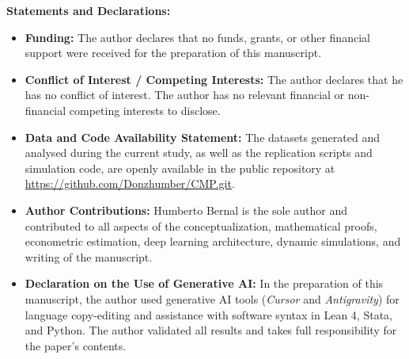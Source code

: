\documentclass[12pt]{article}
\begin{document}
\noindent \textbf{Statements and Declarations:}
\begin{itemize}\small
    \item \textbf{Funding:} The author declares that no funds, grants, or other financial support were received for the preparation of this manuscript.
    \item \textbf{Conflict of Interest / Competing Interests:} The author declares that he has no conflict of interest. The author has no relevant financial or non-financial competing interests to disclose.
    \item \textbf{Data and Code Availability Statement:} The datasets generated and analysed during the current study, as well as the replication scripts and simulation code, are openly available in the public repository at \url{https://github.com/Donzhumber/CMP.git}.
    \item \textbf{Author Contributions:} Humberto Bernal is the sole author and contributed to all aspects of the conceptualization, mathematical proofs, econometric estimation, deep learning architecture, dynamic simulations, and writing of the manuscript.
    \item \textbf{Declaration on the Use of Generative AI:} In the preparation of this manuscript, the author used generative AI tools (\emph{Cursor} and \emph{Antigravity}) for language copy-editing and assistance with software syntax in Lean 4, Stata, and Python. The author validated all results and takes full responsibility for the paper's contents.
\end{itemize}
\end{document}
